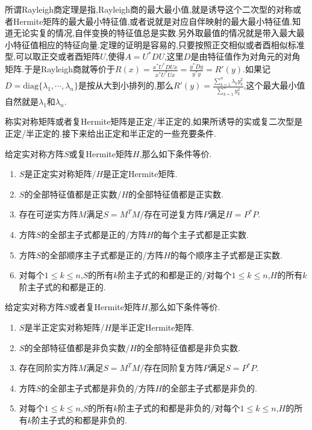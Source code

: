所谓Rayleigh商定理是指,Rayleigh商的最大最小值,就是诱导这个二次型的对称或者Hermite矩阵的最大最小特征值,或者说就是对应自伴映射的最大最小特征值.知道无论实复的情况,自伴变换的特征值总是实数.另外取最值的情况就是带入最大最小特征值相应的特征向量.定理的证明是容易的,只要按照正交相似或者酉相似标准型,可以取正交或者酉矩阵$U$,使得$A=U^*DU$,这里$D$是由特征值作为对角元的对角矩阵.于是Rayleigh商就等价于$R(x)=\frac{x^*U^*DUx}{x^*U^*Ux}=\frac{y^*Dy}{y^*y}=R'(y)$.如果记$D=\mathrm{diag}\{\lambda_1,\cdots,\lambda_n\}$是按从大到小排列的,那么$R'(y)=\frac{\sum_{k=1}^{n}\lambda_ky_k^2}{\sum_{k=1}^{n}y_k^2}$,这个最大最小值自然就是$\lambda_1$和$\lambda_n$.

称实对称矩阵或者复Hermite矩阵是正定/半正定的,如果所诱导的实或复二次型是正定/半正定的.接下来给出正定和半正定的一些充要条件.

给定实对称方阵$S$或复Hermite矩阵$H$,那么如下条件等价.
\begin{enumerate}
	\item $S$是正定实对称矩阵/$H$是正定Hermite矩阵.
	\item $S$的全部特征值都是正实数/$H$的全部特征值都是正实数.
	\item 存在可逆实方阵$M$满足$S=M^TM$/存在可逆复方阵$P$满足$H=P^*P$.
	\item 方阵$S$的全部主子式都是正的/方阵$H$的每个主子式都是正实数.
	\item 方阵$S$的全部顺序主子式都是正的/方阵$H$的每个顺序主子式都是正实数.
	\item 对每个$1\le k\le n$,$S$的所有$k$阶主子式的和都是正的/对每个$1\le k\le n$,$H$的所有$k$阶主子式的和都是正的.
\end{enumerate}

给定实对称方阵$S$或者复Hermite矩阵$H$,那么如下条件等价.
\begin{enumerate}
	\item $S$是半正定实对称矩阵/$H$是半正定Hermite矩阵.
	\item $S$的全部特征值都是非负实数/$H$的全部特征值都是非负实数.
	\item 存在同阶实方阵$M$满足$S=M^TM$/存在同阶复方阵$P$满足$S=P^*P$.
	\item 方阵$S$的全部主子式都是非负的/方阵$H$的全部主子式都是非负的.
	\item 对每个$1\le k\le n$,$S$的所有$k$阶主子式的和都是非负的/对每个$1\le k\le n$,$H$的所有$k$阶主子式的和都是非负的.
\end{enumerate}

